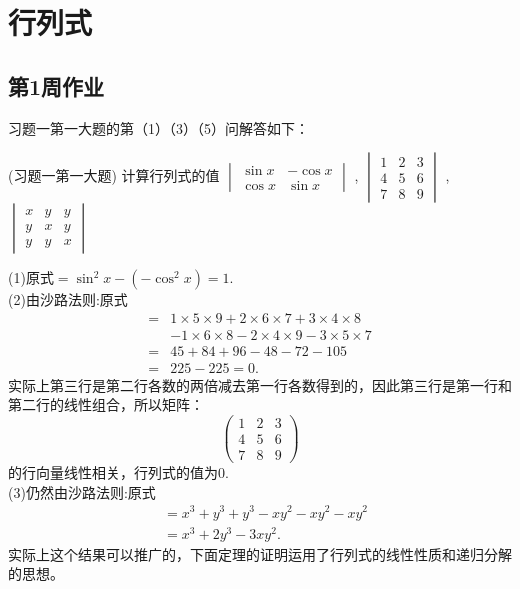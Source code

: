 \chapter{行列式}
\section{第1周作业}
习题一第一大题的第（1）（3）（5）问解答如下：
\begin{example}{(习题一第一大题)}{}
计算行列式的值
$\begin{vmatrix}
    \sin x & -\cos x \\
    \cos x & \sin x
\end{vmatrix}$
,
$\begin{vmatrix}
    1 & 2 & 3 \\
    4 & 5 & 6 \\
    7 & 8 & 9
\end{vmatrix}$
,
$\begin{vmatrix}
    x & y & y \\
    y & x & y \\
    y & y & x
\end{vmatrix}$
\end{example}
\begin{solution}{}{}
    (1)原式$=\sin^2x-(-\cos^2x)=1$.\\
    (2)由沙路法则:原式\vspace{-10pt}\\
    \vspace{-10pt}
    \begin{align*}
        =&1\times5\times9+2\times6\times7+3\times4\times8\\
        &-1\times6\times8-2\times4\times9-3\times5\times7\\
        =&45+84+96-48-72-105\\
        =&225-225=0.
    \end{align*}
    实际上第三行是第二行各数的两倍减去第一行各数得到的，因此第三行是第一行和第二行的线性组合，所以矩阵：
    \[
    \begin{pmatrix} 
        1 & 2 & 3 \\
        4 & 5 & 6 \\
        7 & 8 & 9
    \end{pmatrix}
    \]的行向量线性相关，行列式的值为0.\\
    (3)仍然由沙路法则:原式\vspace{=-10pt}
    \begin{align*}
        &=x^3+y^3+y^3-xy^2-xy^2-xy^2\\
        &=x^3+2y^3-3xy^2.
    \end{align*}
    实际上这个结果可以推广的，下面定理的证明运用了行列式的线性性质和递归分解的思想。
\end{solution}
